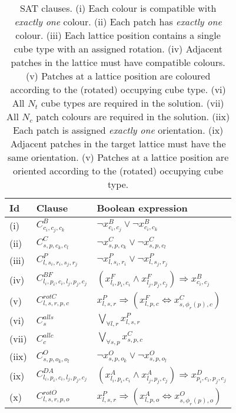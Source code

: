 \begin{table}[h!]
\centering
\begin{tabular}{|l|l|l|}
    \hline
    Id & Clause & Boolean expression \\ [0.5ex] 
    \hline
    \hline
    (i) & \(C^{B}_{c_i,c_j,c_k}\) & \(\neg x_{c_i,c_j}^{B} \lor \neg x_{c_i,c_k}^{B}\) \\ %
    (ii) &  \(C^{C}_{s,p,c_k,c_l}\) & \(\neg x_{s, p, c_k}^{C} \lor \neg x_{s, p, c_l}^{C}\) \\ %
    (iii) & \(C^{P}_{l, s_i, r_i, s_j, r_j}\)  & \(\neg x_{l,s_i,r_i}^{P} \lor \neg x_{l,s_j,r_j}^{P} \) \\ %
    (iv) & \(C^{BF}_{l_i,p_i,c_i,l_j,p_j,c_j}\) & \(\left(x_{l_i,p_i,c_i}^{F} \land x_{l_j,p_j,c_j}^{F} \right) \Rightarrow x_{c_i,c_j}^{B}\) \\ %
    (v) & \(C^{rotC}_{l,s,r,p,c}\) & \(x_{l,s,r}^{P} \Rightarrow \left(x_{l,p,c}^{F} \Leftrightarrow x_{s, \phi_r(p), c}^{C}\right)\) \\ %
    (vi) & \(C^{all s}_{s}\)  & \(\bigvee_{\forall l, r} x_{l,s,r}^{P}\) \\ %
    (vii) & \(C^{all c}_{c}\)  & \(\bigvee_{\forall s, p} x_{s,p,c}^{C}\) \\ %
    (iix) &  \(C^{O}_{s,p,o_k,o_l}\) & \(\neg x_{s, p, o_k}^{O} \lor \neg x_{s, p, o_l}^{O}\) \\ %
    (ix) & \(C^{DA}_{l_i,p_i,c_i,l_j,p_j,c_j}\) & \(\left(x_{l_i,p_i,c_i}^{A} \land x_{l_j,p_j,c_j}^{A} \right) \Rightarrow x_{p_i,c_i,p_j,c_j}^{D}\) \\ %
    (x) & \(C^{rotO}_{l,s,r,p,o}\) & \(x_{l,s,r}^{P} \Rightarrow \left(x_{l,p,o}^{A} \Leftrightarrow x_{s, \phi_r(p), o}^{O}\right)\) \\ %
    
    \hline
\end{tabular}
\caption{SAT clauses. (i) Each colour is compatible with \textit{exactly one} colour. (ii) Each patch has \textit{exactly one} colour. (iii) Each lattice position contains a single cube type with an assigned rotation. (iv) Adjacent patches in the lattice must have compatible colours. (v) Patches at a lattice position are coloured according to the (rotated) occupying cube type. (vi) All \(N_t\) cube types are required in the solution. (vii) All \(N_c\) patch colours are required in the solution. (iix) Each patch is assigned \textit{exactly one} orientation. (ix) Adjacent patches in the target lattice must have the same orientation. (v)  Patches at a lattice position are oriented according to the (rotated) occupying cube type.}
\label{tab:sat_clauses}
\end{table}
